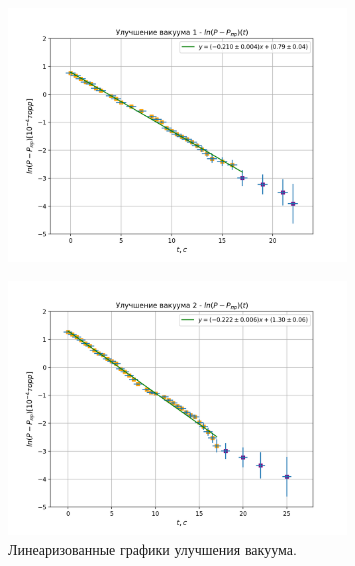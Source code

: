 \documentclass[a4paper, 12pt]{article}
\begin{document}
    \begin{figure}[H]
        \centerline{\includegraphics[width=0.8\textwidth]{pictures/ccum_1.png}}
    \end{figure}
    \begin{figure}[H]
        \centerline{\includegraphics[width=0.8\textwidth]{pictures/ccum_2.png}}
        \caption{Линеаризованные графики улучшения вакуума.}
        \label{ris:ccum}
    \end{figure}

    \newpage
 	
\end{document}
